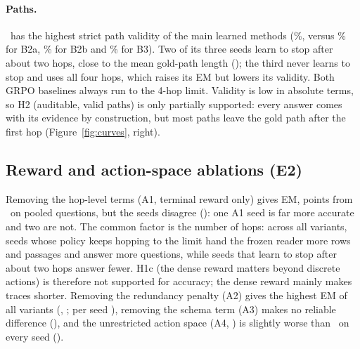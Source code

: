 \paragraph{Paths.}
\hop\ has the highest strict path validity of the main learned methods (\%, versus \% for B2a, \% for B2b and \% for B3). Two of its three seeds learn to stop after about two hops, close to the mean gold-path length (\PathLenTrain); the third never learns to stop and uses all four hops, which raises its EM but lowers its validity. Both GRPO baselines always run to the 4-hop limit.
Validity is low in absolute terms, so H2 (auditable, valid paths) is only partially supported: every answer comes with its evidence by construction, but most paths leave the gold path after the first hop (Figure~\ref{fig:curves}, right).

\begin{table}[t]
\centering\small
\resizebox{\columnwidth}{!}{}
\caption{Paired bootstrap of the EM difference between H1 and each other method on the same questions (10{,}000 resamples): difference, 95\% interval and two-sided $p$.}
\label{tab:paired}
\end{table}

\subsection{Reward and action-space ablations (E2)}
\begin{table}[t]
\centering\small
\resizebox{\textwidth}{!}{}
\caption{Ablations of H1 on HybridQA: terminal-only reward (A1), no redundancy penalty (A2), no schema term (A3) and unrestricted action space (A4). Columns as in Table~\ref{tab:main}.}
\label{tab:ablations}
\end{table}

Removing the hop-level terms (A1, terminal reward only) gives  EM,  points from \hop\ on pooled questions, but the seeds disagree (): one A1 seed is far more accurate and two are not.
The common factor is the number of hops: across all variants, seeds whose policy keeps hopping to the limit hand the frozen reader more rows and passages and answer more questions, while seeds that learn to stop after about two hops answer fewer.
H1c (the dense reward matters beyond discrete actions) is therefore not supported for accuracy; the dense reward mainly makes traces shorter.
Removing the redundancy penalty (A2) gives the highest EM of all variants (, ; per seed ), removing the schema term (A3) makes no reliable difference (), and the unrestricted action space (A4, ) is slightly worse than \hop\ on every seed ().

